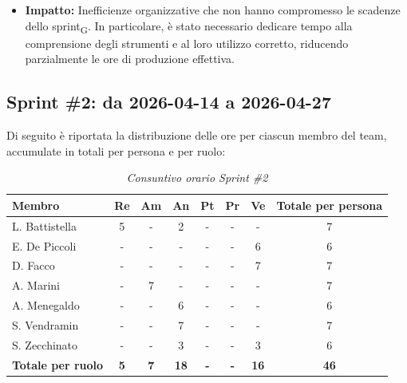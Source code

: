 \documentclass[a4paper, 10pt, colorlinks=true, linkcolor=black, urlcolor=blue, citecolor=blue, hidelinks]{article}
\renewcommand{\arraystretch}{1.2}
\begin{document}
\begin{itemize}
\begin{itemize}
\begin{itemize}
            \item \textbf{Impatto:} Inefficienze organizzative che non hanno compromesso le scadenze dello sprint\textsubscript{G}. In particolare, è stato necessario dedicare tempo alla comprensione degli strumenti e al loro utilizzo corretto, riducendo parzialmente le ore di produzione effettiva.
        \end{itemize}
    \end{itemize}
\end{itemize}

\subsection{Sprint \#2: da 2026-04-14 a 2026-04-27}
Di seguito è riportata la distribuzione delle ore per ciascun membro del team, accumulate in totali per persona e per ruolo:

\begin{table}[H]
    \centering
    \renewcommand{\arraystretch}{1.4}
    \begin{tabular}{|l|c|c|c|c|c|c|c|}
        \hline
        \rowcolor{bluBitless!15}
        \textbf{Membro} & \textbf{Re} & \textbf{Am} & \textbf{An} & \textbf{Pt} & \textbf{Pr} & \textbf{Ve} & \textbf{Totale per persona} \\
        \hline
        L. Battistella & 5 & - & 2 & - & - & - & 7 \\ \hline
        E. De Piccoli & - & - & - & - & - & 6 & 6 \\ \hline
        D. Facco & - & - & - & - & - & 7 & 7 \\ \hline
        A. Marini & - & 7 & - & - & - & - & 7 \\ \hline
        A. Menegaldo & - & - & 6 & - & - & - & 6 \\ \hline
        S. Vendramin & - & - & 7 & - & - & - & 7 \\ \hline
        S. Zecchinato & - & - & 3 & - & - & 3 & 6 \\ \hline
        \rowcolor{bluBitless!8}
        \textbf{Totale per ruolo} & \textbf{5} & \textbf{7} & \textbf{18} & \textbf{-} & \textbf{-} & \textbf{16} & \textbf{46} \\
        \hline
    \end{tabular}
    \caption{\textit{Consuntivo orario Sprint \#2}}
\end{table}
\end{document}
